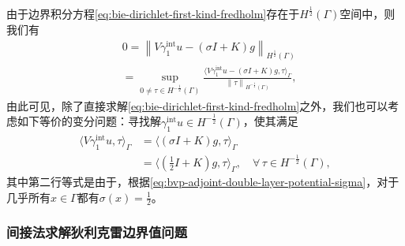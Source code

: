 由于边界积分方程\eqref{eq:bie-dirichlet-first-kind-fredholm}存在于$H^{\frac{1}{2}}(\Gamma)$空间中，则我们有
\begin{equation*}
  \begin{split}
    & 0 = \left\| V \gamma_{1}^{\text{int}} u - \left( \sigma I + K \right) g \right\|_{H^{\frac{1}{2}}(\Gamma)} \\
    & = \sup_{0 \neq \tau \in H^{-\frac{1}{2}}(\Gamma)}
    \frac{
    \langle
    V \gamma_{1}^{\text{int}} u - \left( \sigma I + K \right) g, \tau
    \rangle_{\Gamma}
    }{
    \left\| \tau \right\|_{H^{-\frac{1}{2}}(\Gamma)}
    },
  \end{split}
\end{equation*}
由此可见，除了直接求解\eqref{eq:bie-dirichlet-first-kind-fredholm}之外，我们也可以考虑如下等价的变分问题：寻找解$\gamma_{1}^{\text{int}} u \in H^{-\frac{1}{2}}(\Gamma)$，使其满足
\begin{equation}
  \begin{split}
  \label{eq:bie-dirichlet-direct-variational}
  \langle V \gamma_{1}^{\text{int}} u, \tau \rangle_{\Gamma}
  & = \langle \left( \sigma I + K \right) g, \tau \rangle_{\Gamma} \\
  & = \langle \left( \frac{1}{2} I + K \right) g, \tau \rangle_{\Gamma}, \quad \forall \, \tau \in H^{-\frac{1}{2}}(\Gamma),
\end{split}
\end{equation}
其中第二行等式是由于，根据\eqref{eq:bvp-adjoint-double-layer-potential-sigma}，对于几乎所有$x \in \Gamma$都有$\sigma(x) = \frac{1}{2}$。

\subsubsection{间接法求解狄利克雷边界值问题}
\label{sec:bie-dirichlet-indirect-approach}

